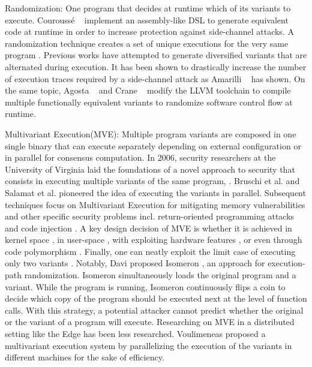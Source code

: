 \begin{usage}{Randomization:}
    \label{usage:randomization}
    \normalfont
    One program that decides at runtime which of its variants to execute. Courouss{\'e} \etal~\cite{courousse2016runtime} implement an assembly-like DSL to generate equivalent code at runtime in order to increase protection against side-channel attacks. 
    A randomization technique creates a set of unique executions for the very same program \cite{bhatkar03}. 
    Previous works have attempted to generate diversified variants that are alternated during execution.
    It has been shown to drastically increase the number of execution traces required by a side-channel attack as
    Amarilli \etal~\cite{amarilli2011can} has shown. On the same topic,
    Agosta \etal~\cite{agosta2015meet} and Crane \etal~\cite{crane2015thwarting}
    modify the LLVM toolchain to compile multiple functionally equivalent variants to randomize software control flow at runtime.
\end{usage}

\begin{usage}{Multivariant Execution(MVE):}
    \label{usage:mve}
    \normalfont
    Multiple program variants are composed in one single binary that can execute separately depending on external configuration or in parallel for consensus computation. In 2006, security researchers at the University of Virginia laid the foundations of a novel approach to security that consists in executing multiple variants of the same program, \cite{cox06}. Bruschi et al. \cite{bruschi2007diversified} and Salamat et al. \cite{salamat2007stopping} pioneered the idea of executing the variants in parallel. Subsequent techniques focus on Multivariant Execution for mitigating memory vulnerabilities \cite{lu2018stopping} and other specific security problems incl. return-oriented programming attacks \cite{volckaert2015cloning} and code injection \cite{SalamatJWWF11}. A key design decision of MVE is whether it is achieved in kernel space \cite{osterlund2019kmvx}, in user-space \cite{salamat2009orchestra}, with exploiting hardware features \cite{koning2016secure}, or even through code polymorphism \cite{10.1145/3281662}. Finally, one can neatly exploit the limit case of executing only two variants \cite{maurer2012tachyon,Kim2015}. Notably,  Davi \etal proposed Isomeron \cite{davi2015isomeron}, an approach  for execution-path randomization. Isomeron simultaneously loads the original program and a variant. While the program is running, Isomeron continuously flips a coin to decide which copy of the program should be executed next at the level of function calls. With this strategy, a potential attacker cannot predict whether the original or the variant of a program will execute.
    Researching on MVE in a distributed setting like the Edge \citationneeded has been less researched. Voulimeneas \etal proposed a multivariant execution system by parallelizing the execution of the variants in different machines \cite{voulimeneas2021dmvx} for the sake of efficiency. 
    
\end{usage}



